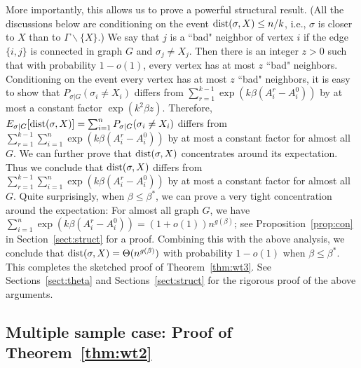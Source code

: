 \documentclass{article}
\begin{document}
More importantly, this allows us to prove a powerful structural result. (All the discussions below are conditioning on the event $\operatorname{dist}(\sigma,X)\le n/k$, i.e., $\sigma$ is closer to $X$ than to $\Gamma\backslash\{X\}$.) We say that $j$ is a ``bad" neighbor of vertex $i$ if the edge $\{i,j\}$ is connected in graph $G$ and $\sigma_j\neq X_j$. Then there is an integer $z>0$ such that with probability $1-o(1)$, every vertex has at most $z$ ``bad" neighbors.
Conditioning on the event every vertex has at most $z$ ``bad" neighbors, it is easy to show that $P_{\sigma|G}(\sigma_i \neq X_i)$ differs from $\sum_{r=1}^{k-1}\exp (k \beta (A^r_i-A^0_i))$ by at most a constant factor $\exp(k^2\beta z)$.
Therefore, $E_{\sigma|G}[\operatorname{dist}(\sigma,X)]=\sum_{i=1}^n P_{\sigma|G}(\sigma_i \neq X_i)$ differs from $\sum_{r=1}^{k-1} \sum_{i=1}^n\exp (k \beta (A^r_i-A^0_i))$ by at most a constant factor for almost all $G$.
We can further prove that $\operatorname{dist}(\sigma,X)$ concentrates around its expectation. Thus we conclude that $\operatorname{dist}(\sigma,X)$ differs from $\sum_{r=1}^{k-1} \sum_{i=1}^n\exp (k \beta (A^r_i-A^0_i))$ by at most a constant factor for almost all $G$.
Quite surprisingly, when $\beta\le\beta^\ast$, we can prove a very tight concentration around the expectation: For almost all graph $G$, we have $\sum_{i=1}^n\exp (k \beta (A^r_i-A^0_i))=(1+o(1))n^{g(\beta)}$; see Proposition~\ref{prop:con} in Section~\ref{sect:struct} for a proof. Combining this with the above analysis, we conclude that $\operatorname{dist}(\sigma,X)=\Theta(n^{g(\beta)})$ with probability $1-o(1)$ when $\beta\le\beta^\ast$. This completes the sketched proof of Theorem~\ref{thm:wt3}.
See Sections~\ref{sect:theta} and Sections~\ref{sect:struct} for the rigorous proof of the above arguments.

\subsection{Multiple sample case: Proof of Theorem~\ref{thm:wt2}}
\label{sect:multi}
\end{document}

